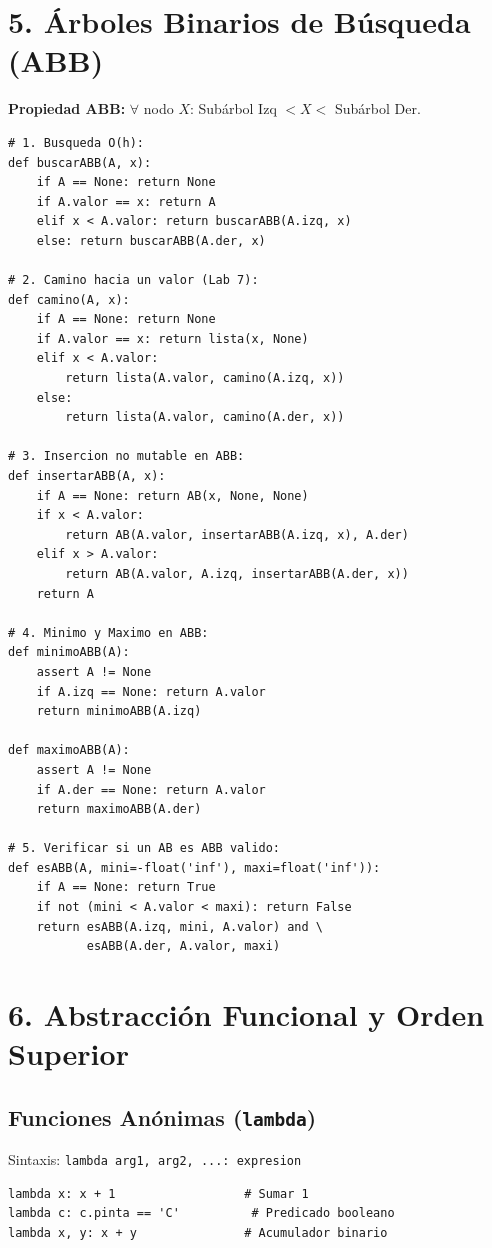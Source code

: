 \documentclass[8pt,twocolumn]{extarticle}
\begin{document}
\section{5. Árboles Binarios de Búsqueda (ABB)}
\textbf{Propiedad ABB:} $\forall$ nodo $X$: Subárbol Izq $< X <$ Subárbol Der.
\begin{verbatim}
# 1. Busqueda O(h):
def buscarABB(A, x):
    if A == None: return None
    if A.valor == x: return A
    elif x < A.valor: return buscarABB(A.izq, x)
    else: return buscarABB(A.der, x)

# 2. Camino hacia un valor (Lab 7):
def camino(A, x):
    if A == None: return None
    if A.valor == x: return lista(x, None)
    elif x < A.valor:
        return lista(A.valor, camino(A.izq, x))
    else:
        return lista(A.valor, camino(A.der, x))

# 3. Insercion no mutable en ABB:
def insertarABB(A, x):
    if A == None: return AB(x, None, None)
    if x < A.valor:
        return AB(A.valor, insertarABB(A.izq, x), A.der)
    elif x > A.valor:
        return AB(A.valor, A.izq, insertarABB(A.der, x))
    return A

# 4. Minimo y Maximo en ABB:
def minimoABB(A):
    assert A != None
    if A.izq == None: return A.valor
    return minimoABB(A.izq)

def maximoABB(A):
    assert A != None
    if A.der == None: return A.valor
    return maximoABB(A.der)

# 5. Verificar si un AB es ABB valido:
def esABB(A, mini=-float('inf'), maxi=float('inf')):
    if A == None: return True
    if not (mini < A.valor < maxi): return False
    return esABB(A.izq, mini, A.valor) and \
           esABB(A.der, A.valor, maxi)
\end{verbatim}

\section{6. Abstracción Funcional y Orden Superior}
\subsection{Funciones Anónimas (\texttt{lambda})}
Sintaxis: \texttt{lambda arg1, arg2, ...: expresion}
\begin{verbatim}
lambda x: x + 1                  # Sumar 1
lambda c: c.pinta == 'C'          # Predicado booleano
lambda x, y: x + y               # Acumulador binario
\end{verbatim}
\end{document}
